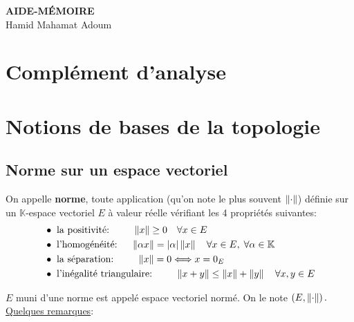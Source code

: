 \documentclass[12pt,a4paper]{article}
\begin{document}
	\begin{center}
		\Huge \textbf{AIDE-MÉMOIRE} \\
		\vspace{0.7cm}
		\LARGE Hamid Mahamat Adoum\normalsize
	\end{center}
	\section*{Complément d'analyse}
	\section{Notions de bases de la topologie}
	\subsection{Norme sur un espace vectoriel}
	\begin{defini}
	On appelle \textbf{norme}, toute application (qu'on note le plus souvent $ \left\|{\cdot}\right\|$) définie sur un $\mathbb{K}$-espace vectoriel $E$ à valeur réelle vérifiant les 4 propriétés suivantes:
	\begin{align}
		&\bullet \text{ la positivité: }  \qquad \left\|{x}\right\|\geq 0 \quad\forall x \in E\\
		&\bullet \text{ l'homogénéité: } \quad\left\|{\alpha x}\right\|=\left\vert {\alpha}\right\vert\left\|{x}\right\| \quad\forall x \in E,\; \forall\alpha\in \mathbb{K}\\ 
		&\bullet \text{ la séparation: } \qquad \left\|{x}\right\|=0\Longleftrightarrow x=0_E \\
		&\bullet \text{ l'inégalité triangulaire: } \qquad\left\|{x+y}\right\|\leq\left\|{x}\right\|+\left\|{y}\right\| \quad\forall x, y \in E
	\end{align}
	\end{defini}
	$E$ muni d'une norme est appelé espace vectoriel normé. On le note $\left(E,\left\|{\cdot}\right\|\right).$ \\ 
	\underline{Quelques remarques}: 
\end{document}
